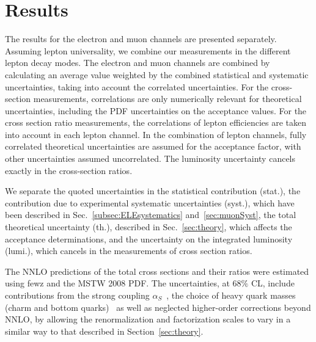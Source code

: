 \section{Results}
\label{sec:results}

The results for the electron and muon channels are presented separately.
Assuming lepton universality, we combine our measurements in the different lepton
decay modes. The electron and muon channels are combined by calculating an
average value weighted by the combined statistical and systematic uncertainties,
taking into account the correlated uncertainties.
For the cross-section measurements, correlations are only numerically
relevant for theoretical uncertainties,
including the PDF uncertainties on the acceptance values. For the cross
section ratio measurements, the correlations
of lepton efficiencies are taken into account in each lepton channel.
In the combination of lepton channels, fully
correlated theoretical uncertainties are assumed for the acceptance factor,
with other uncertainties assumed uncorrelated. The luminosity uncertainty
cancels exactly in the cross-section ratios.

We separate the quoted uncertainties in the statistical contribution (stat.), the
contribution due to experimental systematic uncertainties (syst.), which have been
described in Sec.~\ref{subsec:ELEsystematics} and~\ref{sec:muonSyst}, 
the total theoretical uncertainty (th.), described in Sec.~\ref{sec:theory}, which affects
the acceptance determinations, and the uncertainty on the integrated luminosity (lumi.), which 
cancels in the measurements of cross section ratios.

The NNLO predictions of the total cross sections and their ratios were estimated
using {\sc fewz} and the MSTW 2008 PDF. The uncertainties, at 68$\%$ CL, include
contributions from the strong coupling $\alpha_S$~\cite{Martin:2009bu,GWatt}, the choice of heavy quark masses
(charm and bottom quarks)~\cite{Martin:2009hq} as well as neglected higher-order corrections
beyond NNLO, by allowing the renormalization and factorization scales to vary in a similar way to that
described in Section~\ref{sec:theory}.

